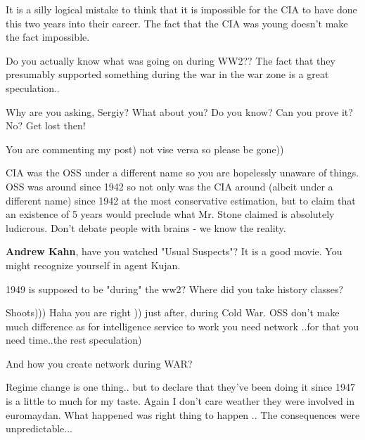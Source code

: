 \begin{itemize}
\begin{itemize}

It is a silly logical mistake to think that it is impossible for the CIA to
have done this two years into their career. The fact that the CIA was young
doesn't make the fact impossible.


Do you actually know what was going on during WW2?? The fact that they
presumably supported something during the war in the war zone is a great
speculation..


Why are you asking, Sergiy? What about you? Do you know? Can you prove it? No?
Get lost then!


You are commenting my post) not vise versa so please be gone))


CIA was the OSS under a different name so you are hopelessly unaware of things.
OSS was around since 1942 so not only was the CIA around (albeit under a
different name) since 1942 at the most conservative estimation, but to claim
that an existence of 5 years would preclude what Mr. Stone claimed is
absolutely ludicrous. Don't debate people with brains - we know the reality.

\textbf{Andrew Kahn}, have you watched "Usual Suspects"? It is a good movie. You might recognize yourself in agent Kujan.

1949 is supposed to be "during" the ww2? Where did you take history classes?


Shoots))) Haha you are right )) just after, during Cold War. OSS don't make
much difference as for intelligence service to work you need network ..for that
you need time..the rest speculation)


And how you create network during WAR?


Regime change is one thing.. but to declare that they've been doing it since
1947 is a little to much for my taste. Again I don't care weather they were
involved in euromaydan. What happened was right thing to happen .. The
consequences were unpredictable...



\end{itemize}
\end{itemize}
